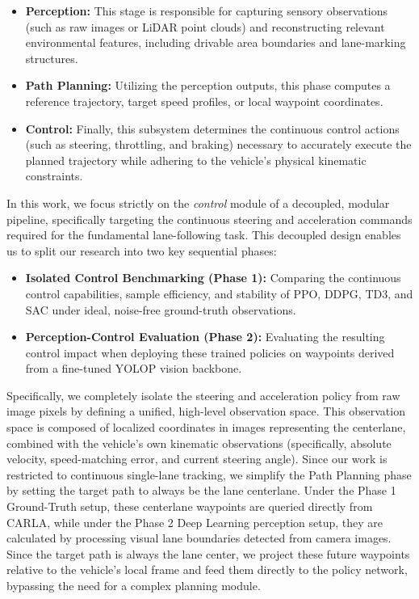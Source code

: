 \documentclass[sn-mathphys,Numbered]{sn-jnl}
\begin{document}
\begin{itemize}
 \item \textbf{Perception:} This stage is responsible for capturing sensory observations (such as raw images or LiDAR point clouds) and reconstructing relevant environmental features, including drivable area boundaries and lane-marking structures.
 \item \textbf{Path Planning:} Utilizing the perception outputs, this phase computes a reference trajectory, target speed profiles, or local waypoint coordinates.
 \item \textbf{Control:} Finally, this subsystem determines the continuous control actions (such as steering, throttling, and braking) necessary to accurately execute the planned trajectory while adhering to the vehicle's physical kinematic constraints.
\end{itemize}

In this work, we focus strictly on the \textit{control} module of a decoupled, modular pipeline, specifically targeting the continuous steering and acceleration commands required for the fundamental lane-following task. This decoupled design enables us to split our research into two key sequential phases:
\begin{itemize}
    \item \textbf{Isolated Control Benchmarking (Phase 1):} Comparing the continuous control capabilities, sample efficiency, and stability of PPO, DDPG, TD3, and SAC under ideal, noise-free ground-truth observations.
    \item \textbf{Perception-Control Evaluation (Phase 2):} Evaluating the resulting control impact when deploying these trained policies on waypoints derived from a fine-tuned YOLOP vision backbone.
\end{itemize}

Specifically, we completely isolate the steering and acceleration policy from raw image pixels by defining a unified, high-level observation space. This observation space is composed of localized coordinates in images representing the centerlane, combined with the vehicle's own kinematic observations (specifically, absolute velocity, speed-matching error, and current steering angle). Since our work is restricted to continuous single-lane tracking, we simplify the Path Planning phase by setting the target path to always be the lane centerlane. Under the Phase 1 Ground-Truth setup, these centerlane waypoints are queried directly from CARLA, while under the Phase 2 Deep Learning perception setup, they are calculated by processing visual lane boundaries detected from camera images. Since the target path is always the lane center, we project these future waypoints relative to the vehicle's local frame and feed them directly to the policy network, bypassing the need for a complex planning module.
\end{document}
